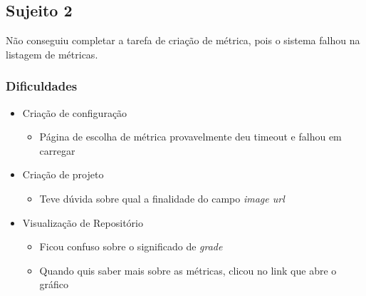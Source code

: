 \subsection{Sujeito 2}
Não conseguiu completar a tarefa de criação de métrica, pois o sistema falhou na listagem de métricas.

  \subsubsection{Dificuldades}
  \begin{itemize}
    \item Criação de configuração
      \begin{itemize}
        \item Página de escolha de métrica provavelmente deu timeout e falhou em carregar
      \end{itemize}
    \item Criação de projeto
      \begin{itemize}
        \item Teve dúvida sobre qual a finalidade do campo \textit{image url}
      \end{itemize}
    \item Visualização de Repositório
      \begin{itemize}
        \item Ficou confuso sobre o significado de \textit{grade}
        \item Quando quis saber mais sobre as métricas, clicou no link que abre o gráfico
      \end{itemize}
  \end{itemize}